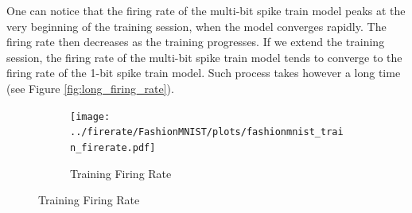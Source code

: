    One can notice that the firing rate of the multi-bit spike train model peaks at the very beginning of the training session, when the model converges rapidly. The firing rate then decreases as the training progresses. If we extend the training session, the firing rate of the multi-bit spike train model tends to converge to the firing rate of the 1-bit spike train model. Such process takes however a long time (see Figure \ref{fig:long_firing_rate}). 
    \begin{figure}[!htpb]
        \centering
        \begin{subfigure}[H]{0.9\textwidth}
            \centering
            \texttt{[image: ../firerate/FashionMNIST/plots/fashionmnist\_train\_firerate.pdf]}
            \caption{Training Firing Rate}
        \end{subfigure}
    \end{figure}
